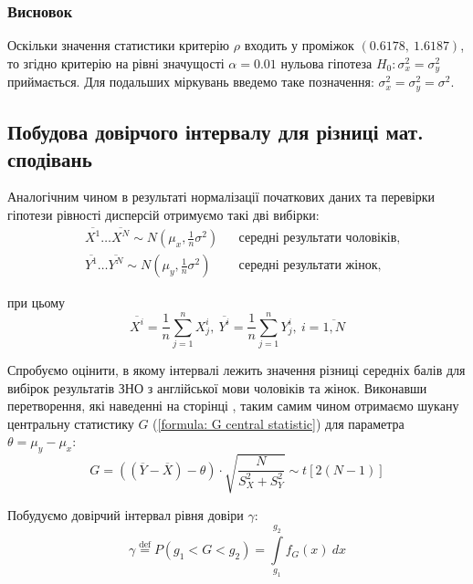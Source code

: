 \subsubsection{Висновок}
\label{page: ENG dispersion hypothesis}

Оскільки значення статистики критерію $\rho$ входить у проміжок $(0.6178,\ 1.6187)$, то згідно критерію 
на рівні значущості $\alpha=0.01$ нульова гіпотеза $H_0: \sigma_x^2=\sigma_y^2$ приймається. 
Для подальших міркувань введемо таке позначення: $\sigma_x^2=\sigma_y^2=\sigma^2$.

\subsection*{Побудова довірчого інтервалу для різниці мат. сподівань}

Аналогічним чином в результаті нормалізації початкових даних та перевірки гіпотези рівності дисперсій 
отримуємо такі дві вибірки: 
\begin{align}
    &\overline{X^1}\ldots \overline{X^N}\sim N(\mu_x,\tfrac{1}{n}\sigma^2) && \text{середні результати чоловіків,} \label{formula: ENG ND X} \\
    &\overline{Y^1}\ldots \overline{Y^N}\sim N(\mu_y,\tfrac{1}{n}\sigma^2) && \text{середні результати жінок,} \label{formula: ENG ND Y}
\end{align}

при цьому
\[ \overline{X^i}=\frac{1}{n}\sum\limits_{j=1}^nX^i_j,\ 
   \overline{Y^i}=\frac{1}{n}\sum\limits_{j=1}^nY^i_j,\ i=\overline{1,N} \]

Спробуємо оцінити, в якому інтервалі лежить значення різниці середніх балів для вибірок результатів ЗНО з 
англійської мови чоловіків та жінок. Виконавши перетворення, які наведенні на сторінці \pageref{page: seaching central statistic}, 
таким самим чином отримаємо шукану центральну статистику $G$ (\ref{formula: G central statistic}) для параметра $\theta=\mu_y-\mu_x:$
\begin{equation*}
    G=\left( (\overline{Y}-\overline{X})-\theta \right)\cdot \sqrt{\frac{N}{S_X^2+S_Y^2}}
    \sim t\left[ 2(N-1) \right]
\end{equation*}

Побудуємо довірчий інтервал рівня довіри $\gamma:$
\begin{equation*}
    \gamma \overset{\mathrm{def}}{=}P(g_1<G<g_2)=\int\limits_{g_1}^{g_2}f_G(x)\ dx
\end{equation*}

